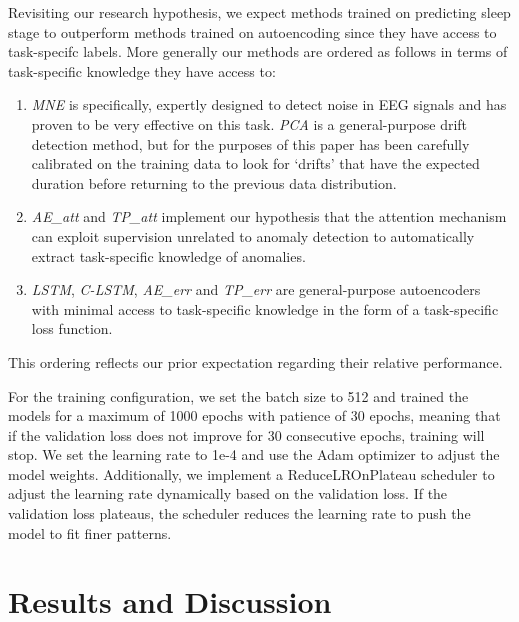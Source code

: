\documentclass[conference]{IEEEtran}
\begin{document}
Revisiting our research hypothesis, we expect methods trained on
predicting sleep stage to outperform methods trained on autoencoding
since they have access to task-specifc labels. More generally our
methods are ordered as follows in terms of task-specific knowledge
they have access to:
%
\begin{enumerate}
\item \emph{MNE} is specifically, expertly designed to detect noise in
  EEG signals and has proven to be very effective on this task.
  \emph{PCA} is a general-purpose drift detection method, but for
  the purposes of this paper has been carefully calibrated on the
  training data to look for `drifts' that have the expected duration
  before returning to the previous data distribution.
\item \emph{AE\_att} and \emph{TP\_att} implement our hypothesis that
  the attention mechanism can exploit supervision unrelated to anomaly
  detection to automatically extract task-specific knowledge of
  anomalies.
\item \emph{LSTM}, \emph{C-LSTM}, \emph{AE\_err} and \emph{TP\_err}
  are general-purpose autoencoders with minimal access to task-specific
  knowledge in the form of a task-specific loss function.
\end{enumerate}
%
This ordering reflects our prior expectation regarding their relative
performance.

For the training configuration, we set the batch size to 512 and
trained the models for a maximum of 1000 epochs with patience of 30
epochs, meaning that if the validation loss does not improve for 30
consecutive epochs, training will stop. We set the learning rate to
1e-4 and use the Adam optimizer to adjust the model
weights. Additionally, we implement a ReduceLROnPlateau scheduler to
adjust the learning rate dynamically based on the validation loss. If
the validation loss plateaus, the scheduler reduces the learning rate
to push the model to fit finer patterns.



\section{Results and Discussion}
\label{sec:results}
\end{document}
